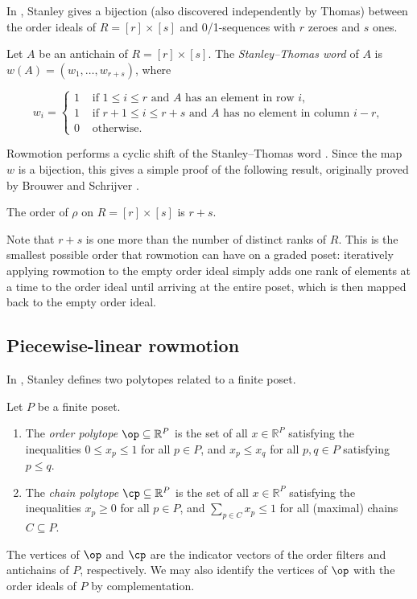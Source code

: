 In \cite{stanley1}, Stanley gives a bijection (also discovered independently by Thomas) between the order ideals of $R = [r] \times [s]$ and 0/1-sequences with $r$ zeroes and $s$ ones.

\begin{Def}
Let $A$ be an antichain of $R = [r] \times [s]$. The \emph{Stanley--Thomas word} of $A$ is $w(A) = (w_1, \dots, w_{r+s})$, where

\[w_i = \begin{cases} 1 &\text{ if } 1\leq i \leq r \text{ and } A \text{ has an element in row } i, \\ 
1 &\text{ if } r+1 \leq i \leq r+s \text{ and } A \text{ has no element in column } i-r, \\ 
0 &\text{ otherwise.} \end{cases}\]
\end{Def}

Rowmotion performs a cyclic shift of the Stanley--Thomas word \cite{propproby}. Since the map $w$ is a bijection, this gives a simple proof of the following result, originally proved by %
Brouwer and Schrijver \cite{brouwerschrijver}.

\begin{Th}
The order of $\rho$ on $R=[r] \times [s]$ is $r+s$.
\end{Th}

Note that $r+s$ is one more than the number of distinct ranks of $R$. This is the smallest possible order that rowmotion can have on a graded poset: iteratively applying rowmotion to the empty order ideal simply adds one rank of elements at a time to the order ideal until arriving at the entire poset, which is then mapped back to the empty order ideal.

\subsection{Piecewise-linear rowmotion}

In \cite{stanley2}, Stanley defines two polytopes related to a finite poset.

\begin{Def}
Let $P$ be a finite poset. 

\begin{enumerate}
    \item The \emph{order polytope} $\op \subseteq \mathbb{R}^P$ is the set of all $x \in \mathbb{R}^P$ satisfying the inequalities $0 \leq x_p \leq 1$ for all $p \in P$, and $x_p \leq x_q$ for all $p,q \in P$ satisfying $p \leq q$.
    \item The \emph{chain polytope} $\cp \subseteq \mathbb{R}^P$ is the set of all $x \in \mathbb{R}^P$ satisfying  the inequalities $x_p \geq 0$ for all $p \in P$, and $\sum_{p \in C} x_p \leq 1$ for all (maximal) chains $C \subseteq P$.
\end{enumerate}
\end{Def}
The vertices of $\op$ and $\cp$ are the indicator vectors of the order filters and antichains of $P$, respectively. We may also identify the vertices of $\op$ with the order ideals of $P$ by complementation.

